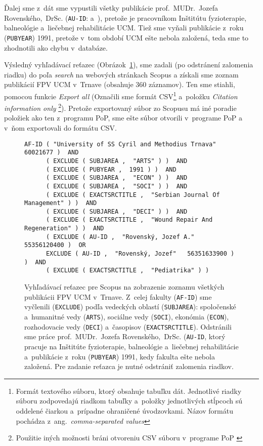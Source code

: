 Ďalej sme z~dát sme vypustili všetky publikácie prof.~MUDr.~Jozefa
Rovenského,~DrSc.  (\texttt{AU-ID}:  a~), pretože je pracovníkom Inštitútu fyzioterapie, balneológie
a~liečebnej rehabilitácie UCM.  Tiež sme vyňali publikácie z~roku
(\texttt{PUBYEAR}) 1991, pretože v~tom období UCM ešte nebola založená, teda sme
to zhodnotili ako chybu v~databáze.

Výsledný vyhľadávací reťazec (Obrázok~\ref{fig:scopus.query}), sme zadali (po
odstránení zalomenia riadku) do poľa \emph{search} na webových stránkach Scopus
a získali sme zoznam publikácií FPV UCM v~Trnave (obsahuje 360 záznamov).  Ten
sme stiahli, pomocou funkcie \emph{Export all} (Označili sme formát
CSV\footnote{Formát textového súboru, ktorý obsahuje tabuľku dát.  Jednotlivé
  riadky súboru zodpovedajú riadkom tabuľky a~položky jednotlivých stĺpcoch sú
  oddelené čiarkou a~prípadne ohraničené úvodzovkami.  Názov formátu pochádza
  z~ang.~\emph{comma-separated values}} a~položku \emph{Citation information
  only} \footnote {Použitie iných možnosti bráni otvoreniu CSV súboru v~programe
  PoP \citep{Harzing2011}}).  Pretože exportovaný súbor zo Scopusu má iné
poradie položiek ako ten z~programu PoP, sme ešte súbor otvorili v~programe PoP
a v~ňom exportovali do formátu CSV.


\begin{figure}
  \footnotesize
  \begin{Verbatim}[frame=single]
    AF-ID ( "University of SS Cyril and Methodius Trnava"   60021677 )  AND
      ( EXCLUDE ( SUBJAREA ,  "ARTS" ) )  AND
      ( EXCLUDE ( PUBYEAR ,  1991 ) )  AND
      ( EXCLUDE ( SUBJAREA ,  "ECON" ) )  AND
      ( EXCLUDE ( SUBJAREA ,  "SOCI" ) )  AND
      ( EXCLUDE ( EXACTSRCTITLE ,  "Serbian Journal Of Management" ) )  AND
      ( EXCLUDE ( SUBJAREA ,  "DECI" ) )  AND
      ( EXCLUDE ( EXACTSRCTITLE ,  "Wound Repair And Regeneration" ) )  AND
      ( EXCLUDE ( AU-ID ,  "Rovenský, Jozef A."   55356120400 )  OR
      EXCLUDE ( AU-ID ,  "Rovenský, Jozef"   56351633900 ) )  AND
      ( EXCLUDE ( EXACTSRCTITLE ,  "Pediatrika" ) )
  \end{Verbatim}
  \vspace*{-4mm}
  \caption[Vyhľadávací reťazec pre celú fakultu pre Scopus]%
  {Vyhľadávací reťazec pre Scopus na zobrazenie zoznamu všetkých publikácii FPV
    UCM v~Trnave.  Z~celej fakulty (\texttt{AF-ID}) sme vyčlenili
    (\texttt{EXCLUDE}) podľa vedeckých oblastí (\texttt{SUBJAREA}): spoločenské
    a~humanitné vedy (\texttt{ARTS}), sociálne vedy (\texttt{SOCI}), ekonómia
    (\texttt{ECON}), rozhodovacie vedy (\texttt{DECI}) a~časopisov
    (\texttt{EXACTSRCTITLE}).  Odstránili sme práce prof.~MUDr.~Jozefa
    Rovenského,~DrSc.  (\texttt{AU-ID}, ktorý pracuje na Inštitúte
    fyzioterapie, balneológie a~liečebnej rehabilitácie a~publikácie z~roku
    (\texttt{PUBYEAR}) 1991, kedy fakulta ešte nebola založená.  Pre zadanie
    reťazca je nutné odstrániť zalomenia riadkov.}
  \label{fig:scopus.query}
\end{figure}


